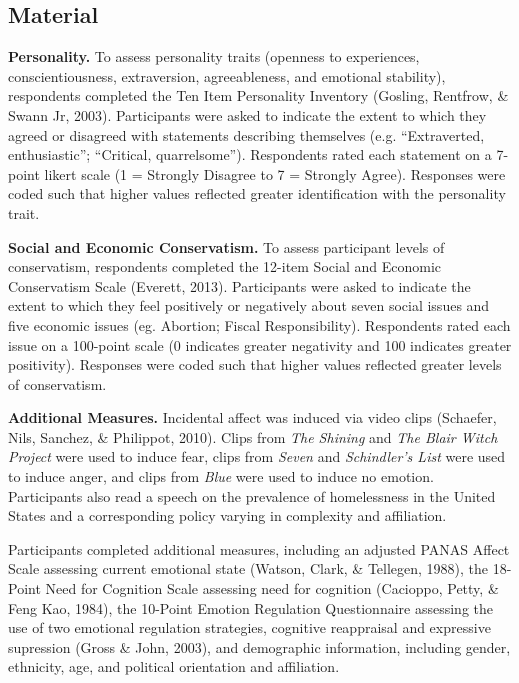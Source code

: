 \documentclass[man]{apa6}
\begin{document}
\subsection{Material}\label{material}

\textbf{Personality.} To assess personality traits (openness to
experiences, conscientiousness, extraversion, agreeableness, and
emotional stability), respondents completed the Ten Item Personality
Inventory (Gosling, Rentfrow, \& Swann Jr, 2003). Participants were
asked to indicate the extent to which they agreed or disagreed with
statements describing themselves (e.g. \enquote{Extraverted,
enthusiastic}; \enquote{Critical, quarrelsome}). Respondents rated each
statement on a 7-point likert scale (1 = Strongly Disagree to 7 =
Strongly Agree). Responses were coded such that higher values reflected
greater identification with the personality trait.

\textbf{Social and Economic Conservatism.} To assess participant levels
of conservatism, respondents completed the 12-item Social and Economic
Conservatism Scale (Everett, 2013). Participants were asked to indicate
the extent to which they feel positively or negatively about seven
social issues and five economic issues (eg. Abortion; Fiscal
Responsibility). Respondents rated each issue on a 100-point scale (0
indicates greater negativity and 100 indicates greater positivity).
Responses were coded such that higher values reflected greater levels of
conservatism.

\textbf{Additional Measures.} Incidental affect was induced via video
clips (Schaefer, Nils, Sanchez, \& Philippot, 2010). Clips from
\emph{The Shining} and \emph{The Blair Witch Project} were used to
induce fear, clips from \emph{Seven} and \emph{Schindler's List} were
used to induce anger, and clips from \emph{Blue} were used to induce no
emotion. Participants also read a speech on the prevalence of
homelessness in the United States and a corresponding policy varying in
complexity and affiliation.

Participants completed additional measures, including an adjusted PANAS
Affect Scale assessing current emotional state (Watson, Clark, \&
Tellegen, 1988), the 18-Point Need for Cognition Scale assessing need
for cognition (Cacioppo, Petty, \& Feng Kao, 1984), the 10-Point Emotion
Regulation Questionnaire assessing the use of two emotional regulation
strategies, cognitive reappraisal and expressive supression (Gross \&
John, 2003), and demographic information, including gender, ethnicity,
age, and political orientation and affiliation.
\end{document}
